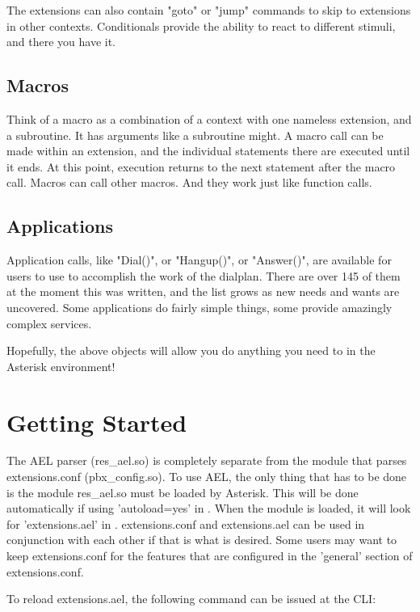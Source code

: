 The extensions can also contain "goto" or "jump" commands to skip to
extensions in other contexts. Conditionals provide the ability to
react to different stimuli, and there you have it.

\subsection{Macros}

Think of a macro as a combination of a context with one nameless
extension, and a subroutine. It has arguments like a subroutine
might. A macro call can be made within an extension, and the
individual statements there are executed until it ends. At this point,
execution returns to the next statement after the macro call. Macros
can call other macros. And they work just like function calls.

\subsection{Applications}

Application calls, like "Dial()", or "Hangup()", or "Answer()", are
available for users to use to accomplish the work of the
dialplan. There are over 145 of them at the moment this was written,
and the list grows as new needs and wants are uncovered. Some
applications do fairly simple things, some provide amazingly complex
services.

Hopefully, the above objects will allow you do anything you need to in
the Asterisk environment!

\section{Getting Started}

The AEL parser (res\_ael.so) is completely separate from the module
that parses extensions.conf (pbx\_config.so). To use AEL, the only
thing that has to be done is the module res\_ael.so must be loaded by
Asterisk. This will be done automatically if using 'autoload=yes' in
. When the module is loaded, it will look
for 'extensions.ael' in . extensions.conf and
extensions.ael can be used in conjunction with
each other if that is what is desired. Some users may want to keep
extensions.conf for the features that are configured in the 'general'
section of extensions.conf.

To reload extensions.ael, the following command can be issued at the
CLI:

